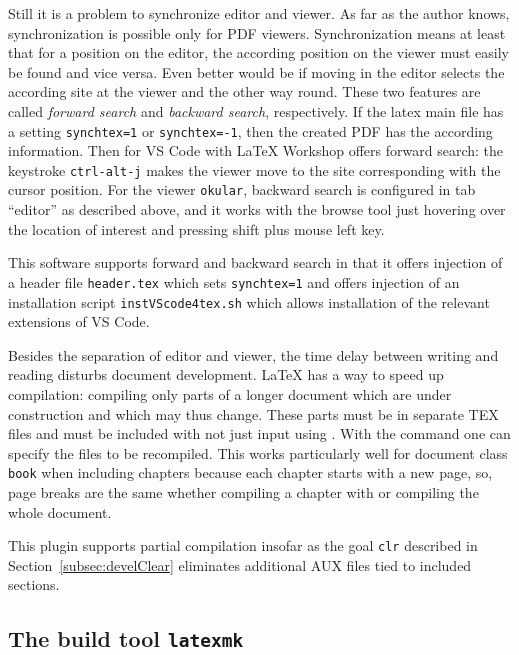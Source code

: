 Still it is a problem to synchronize editor and viewer. 
As far as the author knows, synchronization is possible only for PDF viewers. 
Synchronization means at least that for a position on the editor, 
the according position on the viewer must easily be found 
and vice versa. 
Even better would be if moving in the editor selects the according site at the viewer 
and the other way round. 
These two features are called \emph{forward search} and \emph{backward search}, respectively. 
If the latex main file has a setting \texttt{synchtex=1} or \texttt{synchtex=-1}, 
then the created PDF has the according information. 
Then for VS Code with \LaTeX{} Workshop offers forward search: 
the keystroke \texttt{ctrl-alt-j} 
makes the viewer move to the site corresponding with the cursor position. 
For the viewer \texttt{okular}, backward search is configured in tab ``editor'' 
as described above, 
and it works with the browse tool just hovering over the location of interest 
and pressing shift plus mouse left key. 

This software supports forward and backward search 
in that it offers injection of a header file \texttt{header.tex} 
which sets \texttt{synchtex=1} 
and offers injection of an installation script \texttt{instVScode4tex.sh} 
which allows installation of the relevant extensions of VS Code. 
\medskip


Besides the separation of editor and viewer, 
the time delay between writing and reading 
disturbs document development. 
\LaTeX{} has a way to speed up compilation: 
compiling only parts of a longer document 
which are under construction and which may thus change. 
These parts must be in separate TEX files 
and must be included with  
not just input using . 
With the command  
one can specify the files to be recompiled. 
This works particularly well for document class \texttt{book} 
when including chapters because each chapter starts with a new page, 
so, page breaks are the same whether 
compiling a chapter with  
or compiling the whole document. 

This plugin supports partial compilation 
insofar as the goal \texttt{clr} described in Section~\ref{subsec:develClear} 
eliminates additional AUX files tied to included sections. 


\subsection{The build tool \texttt{latexmk}}\label{subsec:develLatexmk}

